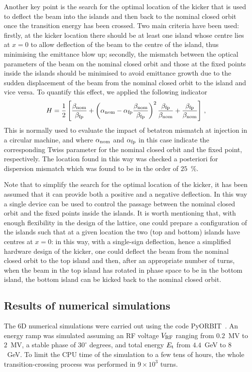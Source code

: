 \documentclass{article}
\begin{document}
Another key point is the search for the optimal location of the kicker that is used to deflect the beam into the islands and then back to the nominal closed orbit once the transition energy has been crossed. Two main criteria have been used: firstly, at the kicker location there should be at least one island whose centre lies at $x=0$ to allow deflection of the beam to the centre of the island, thus minimising the emittance blow up; secondly, the mismatch between the optical parameters of the beam on the nominal closed orbit and those at the fixed points inside the islands should be minimised to avoid emittance growth due to the sudden displacement of the beam from the nominal closed orbit to the island and vice versa. To quantify this effect, we applied the following indicator~\cite{bryant}
%
\begin{equation}
 H = \frac{1}{2} \left [ \frac{\beta_{\rm nom}}{\beta_{\rm fp}} + \left ( \alpha_{\rm nom} - \alpha_{\rm fp} \frac{\beta_{\rm nom}}{\beta_{\rm fp}} \right )^2 \frac{\beta_{\rm fp}}{\beta_{\rm nom}} + \frac{\beta_{\rm fp}}{\beta_{\rm nom}} \right ] \, , 
\end{equation}
%
This is normally used to evaluate the impact of betatron mismatch at injection in a circular machine, and where $\alpha_{\rm nom}$ and $\alpha_{\rm fp}$ in this case indicate the corresponding Twiss parameter for the nominal closed orbit and the fixed point, respectively. The location found in this way was checked a posteriori for dispersion mismatch which was found to be in the order of $25$~\%. 

Note that to simplify the search for the optimal location of the kicker, it has been assumed that it can provide both a positive and a negative deflection. In this way a single device can be used to control the passage between the nominal closed orbit and the fixed points inside the islands. It is worth mentioning that, with enough flexibility in the design of the lattice, one could prepare a configuration of the islands such that at a given location the two (top and bottom) islands have centres at $x=0$: in this way, with a single-sign deflection, hence a simplified hardware design of the kicker, one could deflect the beam from the nominal closed orbit to the top island and then, after an appropriate number of turns, when the beam in the top island has rotated in phase space to be in the bottom island, the bottom island can be kicked back to the nominal closed orbit.   
%
\subsection{Results of numerical simulations}
%
The 6D numerical simulations were carried out using the code PyORBIT~\cite{pyorbit}. An energy ramp was simulated assuming an RF voltage $V_{\rm RF}$ ranging from $0.2$~MV to $2$~MV, a stable phase of $30^\circ$ degrees, and total energy  $E_{\rm t}$ from $4.4$~GeV to $8$~GeV. To limit the CPU time of the simulation to a few tens of hours, the whole transition-crossing process was performed in $9\times 10^3$ turns. 
\end{document}
